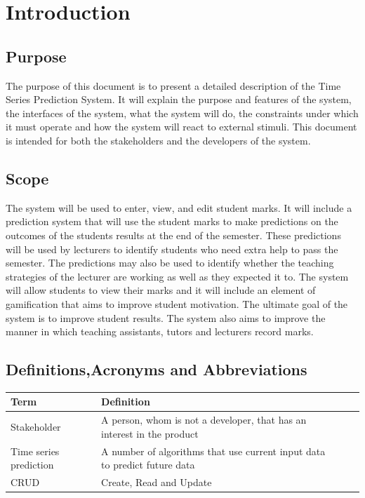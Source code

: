 \documentclass[a4paper,12pt]{article}
\begin{document}
    \tableofcontents
    \section{Introduction}
    	
        \subsection{Purpose}
        
The purpose of this document is to present a detailed description of the Time Series Prediction System. It will explain the purpose and features of the system, the interfaces of the system, what the system will do, the constraints under which it must operate and how the system will react to external stimuli. This document is intended for both the stakeholders and the developers of the system.
        \subsection{Scope}
The system will be used to enter, view, and edit student marks. It will include a prediction system that will use the student marks to make predictions on the outcomes of the students results at the end of the semester. These predictions will be used by lecturers to identify students who need extra help to pass the semester. The predictions may also be used to identify whether the teaching strategies of the lecturer are working as well as they expected it to. The system will allow students to view their marks and it will include an element of gamification that aims to improve student motivation. The ultimate goal of the system is to improve student results. The system also aims to improve the manner in which teaching assistants, tutors and lecturers record marks.
        \subsection{Definitions,Acronyms and Abbreviations}
\begin{center}
	\begin{tabularx}{\textwidth}{ |X|X|X|X| }
	\hline
	Term & Definition \\
	\hline
	Stakeholder & A person, whom is not a developer, that has an interest in the product\\
	\hline
	Time series prediction & A number of algorithms that use current input data to predict future data\\
	\hline
	CRUD & Create, Read and Update\\
	\hline
	\end{tabularx}
\end{center}
\end{document}
